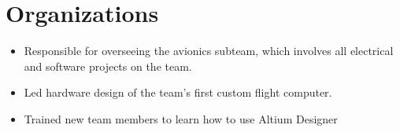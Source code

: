 \documentclass[]{deedy-resume-openfont}
\begin{document}
\begin{minipage}[t]{0.66\textwidth}





\section{Organizations}

\begin{itemize}
    \item Responsible for overseeing the avionics subteam, which involves all electrical and software projects on the team.
    \item Led hardware design of the team's first custom flight computer.
    \item Trained new team members to learn how to use Altium Designer 
\end{itemize}



\end{minipage}
\end{document}

